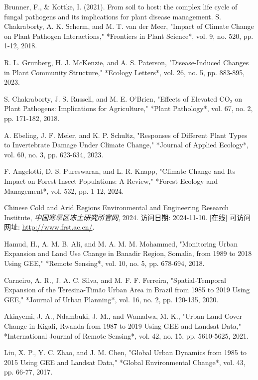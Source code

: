 \documentclass{article}
\begin{document}
\begin{thebibliography}{99}
 Brunner, F., \& Kottke, I. (2021). From soil to host: the complex life cycle of fungal pathogens and its implications for plant disease management.
 S. Chakraborty, A. K. Scherm, and M. T. van der Meer, "Impact of Climate Change on Plant Pathogen Interactions," *Frontiers in Plant Science*, vol. 9, no. 520, pp. 1-12, 2018.

 R. L. Grunberg, H. J. McKenzie, and A. S. Paterson, "Disease-Induced Changes in Plant Community Structure," *Ecology Letters*, vol. 26, no. 5, pp. 883-895, 2023.

 S. Chakraborty, J. S. Russell, and M. E. O'Brien, "Effects of Elevated CO₂ on Plant Pathogens: Implications for Agriculture," *Plant Pathology*, vol. 67, no. 2, pp. 171-182, 2018.

 A. Ebeling, J. F. Meier, and K. P. Schultz, "Responses of Different Plant Types to Invertebrate Damage Under Climate Change," *Journal of Applied Ecology*, vol. 60, no. 3, pp. 623-634, 2023.

 F. Angelotti, D. S. Pureswaran, and L. R. Knapp, "Climate Change and Its Impact on Forest Insect Populations: A Review," *Forest Ecology and Management*, vol. 532, pp. 1-12, 2024.

 Chinese Cold and Arid Regions Environmental and Engineering Research Institute, \textit{中国寒旱区冻土研究所官网}, 2024. 访问日期: 2024-11-10. [在线] 可访问网址: \url{http://www.frst.ac.cn/}.



 Hamud, H., A. M. B. Ali, and M. A. M. M. Mohammed, "Monitoring Urban Expansion and Land Use Change in Banadir Region, Somalia, from 1989 to 2018 Using GEE," *Remote Sensing*, vol. 10, no. 5, pp. 678-694, 2018.

 Carneiro, A. R., J. A. C. Silva, and M. F. F. Ferreira, "Spatial-Temporal Expansion of the Teresina-Timão Urban Area in Brazil from 1985 to 2019 Using GEE," *Journal of Urban Planning*, vol. 16, no. 2, pp. 120-135, 2020.

 Akinyemi, J. A., Ndambuki, J. M., and Wamalwa, M. K., "Urban Land Cover Change in Kigali, Rwanda from 1987 to 2019 Using GEE and Landsat Data," *International Journal of Remote Sensing*, vol. 42, no. 15, pp. 5610-5625, 2021.

 Liu, X. P., Y. C. Zhao, and J. M. Chen, "Global Urban Dynamics from 1985 to 2015 Using GEE and Landsat Data," *Global Environmental Change*, vol. 43, pp. 66-77, 2017.



\end{thebibliography}
\end{document}
